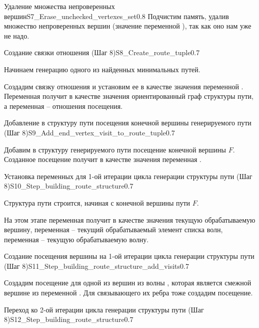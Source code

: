 \begin{itemize}
\begin{algostep}{Удаление множества непроверенных
    вершин}{S7_Erase_unchecked_vertexes_set}{0.8}
  Подчистим память, удалив множество непроверенных вершин (значение
  переменной ), так как оно нам уже не
  надо.
\end{algostep}


\begin{algostep}{Создание связки отношения  (Шаг
    8)}{S8_Create_route_tuple}{0.7}
 
  Начинаем генерацию одного из найденных минимальных путей.

  Создадим связку отношения  и установим ее в качестве
  значения переменной . Переменная 
  получит в качестве значения ориентированный граф структуры пути, а
  переменная  – отношения посещения.
\end{algostep}


\begin{algostep}{Добавление в структуру пути посещения конечной
    вершины генерируемого пути (Шаг
    8)}{S9_Add_end_vertex_visit_to_route_tuple}{0.7}
 
  Добавим в структуру генерируемого пути посещение конечной вершины
  $F$. Созданное посещение получит в качестве значения переменная
  .
\end{algostep}


\begin{algostep}{Установка переменных для 1-ой итерации цикла генерации
    структуры пути (Шаг 8)}{S10_Step_building_route_structure}{0.7}
  
  Структура пути строится, начиная с конечной вершины пути $F$.

  На этом этапе переменная  получит в качестве
  значения текущую обрабатываемую вершину, переменная 
  – текущий обрабатываемый элемент списка волн, переменная
   – текущую обрабатываемую волну.
\end{algostep}


\begin{algostep}{Создание посещения вершины на 1-ой итерации цикла
    генерации структуры пути (Шаг
    8)}{S11_Step_building_route_structure_add_visits}{0.7}
 
  Создадим посещение для одной из вершин из волны ,
  которая является смежной вершине из переменной
  . Для связывающего их ребра тоже создадим
  посещение.
\end{algostep}  


\begin{algostep}{Переход ко 2-ой итерации цикла генерации структуры
    пути (Шаг 8)}{S12_Step_building_route_structure}{0.7}
 

\end{algostep}
\end{itemize}
